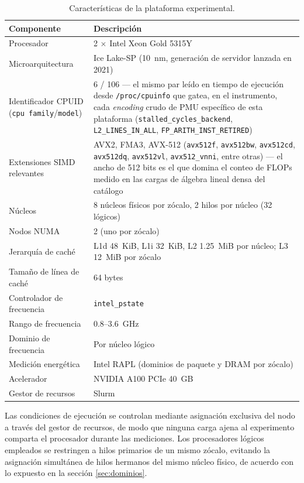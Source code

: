 \documentclass[12pt,oneside,spanish]{book}
\begin{document}
\begin{table}[H]
\centering
\caption{Características de la plataforma experimental.}
\label{tab:plataforma}
\begin{tabular}{@{}ll@{}}
\toprule
\textbf{Componente} & \textbf{Descripción} \\
\midrule
Procesador & 2 $\times$ Intel Xeon Gold 5315Y \\
Microarquitectura & Ice Lake-SP (10~nm, generación de servidor lanzada en 2021) \\
Identificador CPUID (\texttt{cpu family}/\texttt{model}) & 6 / 106 --- el mismo par leído en tiempo de ejecución desde \texttt{/proc/cpuinfo} que gatea, en el instrumento, cada \textit{encoding} crudo de PMU específico de esta plataforma (\texttt{stalled\_cycles\_backend}, \texttt{L2\_LINES\_IN\_ALL}, \texttt{FP\_ARITH\_INST\_RETIRED}) \\
Extensiones SIMD relevantes & AVX2, FMA3, AVX-512 (\texttt{avx512f}, \texttt{avx512bw}, \texttt{avx512cd}, \texttt{avx512dq}, \texttt{avx512vl}, \texttt{avx512\_vnni}, entre otras) --- el ancho de 512 bits es el que domina el conteo de FLOPs medido en las cargas de álgebra lineal densa del catálogo \\
Núcleos & 8 núcleos físicos por zócalo, 2 hilos por núcleo (32 lógicos) \\
Nodos NUMA & 2 (uno por zócalo) \\
Jerarquía de caché & L1d 48~KiB, L1i 32~KiB, L2 1.25~MiB por núcleo; L3 12~MiB por zócalo \\
Tamaño de línea de caché & 64 bytes \\
Controlador de frecuencia & \texttt{intel\_pstate} \\
Rango de frecuencia & 0.8--3.6~GHz \\
Dominio de frecuencia & Por núcleo lógico \\
Medición energética & Intel RAPL (dominios de paquete y DRAM por zócalo) \\
Acelerador & NVIDIA A100 PCIe 40~GB \\
Gestor de recursos & Slurm \\
\bottomrule
\end{tabular}
\end{table}

Las condiciones de ejecución se controlan mediante asignación exclusiva del nodo a través del gestor de recursos, de modo que ninguna carga ajena al experimento comparta el procesador durante las mediciones. Los procesadores lógicos empleados se restringen a hilos primarios de un mismo zócalo, evitando la asignación simultánea de hilos hermanos del mismo núcleo físico, de acuerdo con lo expuesto en la sección \ref{sec:dominios}.
\end{document}
